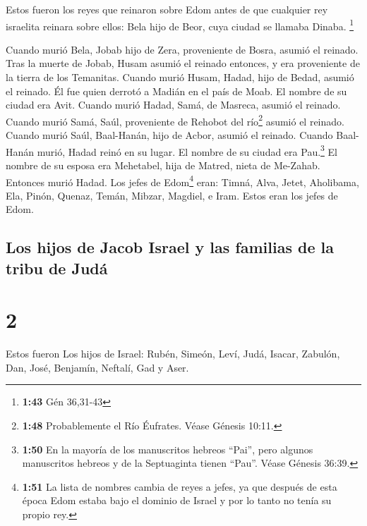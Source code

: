  Estos fueron los reyes que reinaron sobre Edom antes de
que cualquier rey israelita reinara sobre ellos: Bela hijo de Beor, cuya
ciudad se llamaba Dinaba. \footnote{\textbf{1:43} Gén 36,31-43}

 Cuando murió Bela, Jobab hijo de Zera, proveniente de
Bosra, asumió el reinado.  Tras la muerte de Jobab, Husam
asumió el reinado entonces, y era proveniente de la tierra de los
Temanitas.  Cuando murió Husam, Hadad, hijo de Bedad,
asumió el reinado. Él fue quien derrotó a Madián en el país de Moab. El
nombre de su ciudad era Avit.  Cuando murió Hadad, Samá,
de Masreca, asumió el reinado.  Cuando murió Samá, Saúl,
proveniente de Rehobot del río\footnote{\textbf{1:48} Probablemente el
  Río Éufrates. Véase Génesis 10:11.} asumió el reinado. 
Cuando murió Saúl, Baal-Hanán, hijo de Acbor, asumió el reinado.
 Cuando Baal-Hanán murió, Hadad reinó en su lugar. El
nombre de su ciudad era Pau.\footnote{\textbf{1:50} En la mayoría de los
  manuscritos hebreos ``Pai'', pero algunos manuscritos hebreos y de la
  Septuaginta tienen ``Pau''. Véase Génesis 36:39.} El nombre de su
esposa era Mehetabel, hija de Matred, nieta de Me-Zahab. 
Entonces murió Hadad. Los jefes de Edom\footnote{\textbf{1:51} La lista
  de nombres cambia de reyes a jefes, ya que después de esta época Edom
  estaba bajo el dominio de Israel y por lo tanto no tenía su propio
  rey.} eran: Timná, Alva, Jetet,  Aholibama, Ela, Pinón,
 Quenaz, Temán, Mibzar,  Magdiel, e Iram.
Estos eran los jefes de Edom.

\hypertarget{los-hijos-de-jacob-israel-y-las-familias-de-la-tribu-de-juduxe1}{%
\subsection{Los hijos de Jacob Israel y las familias de la tribu de
Judá}\label{los-hijos-de-jacob-israel-y-las-familias-de-la-tribu-de-juduxe1}}

\hypertarget{section-1}{%
\section{2}\label{section-1}}

 Estos fueron Los hijos de Israel: Rubén, Simeón, Leví,
Judá, Isacar, Zabulón,  Dan, José, Benjamín, Neftalí, Gad
y Aser.

